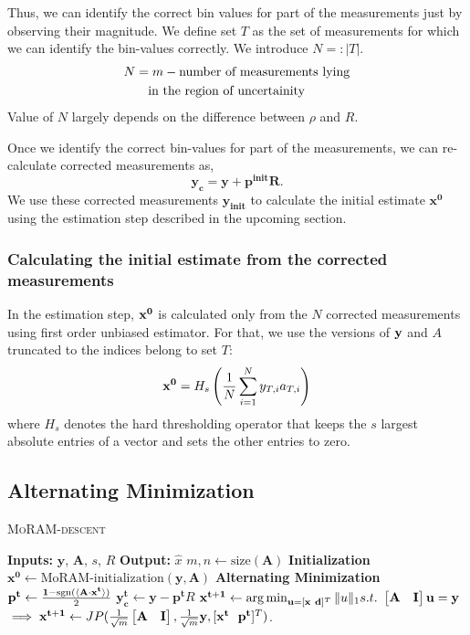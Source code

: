 Thus, we can identify the correct bin values for part of the measurements just by observing their magnitude. We define set $T$ as the set of measurements for which we can identify the bin-values correctly. We introduce $N=:|T|$.
\begin{align*}
N & =  m - \textnormal{number of measurements lying} \\
&~~~\textnormal{in the region of uncertainity}
\end{align*}
Value of $N$ largely depends on the difference between $\rho$ and $R$.

Once we identify the correct bin-values for part of the measurements, we can re-calculate corrected measurements as,
$$
\mathbf{y_{c} = y + p^{init}R}.
$$
We use these corrected measurements $\mathbf{y_{init}}$ to calculate the initial estimate $\mathbf{{x}^0}$ using the estimation step described in the upcoming section.
\subsubsection{Calculating the initial estimate from the corrected measurements}
In the estimation step, $\mathbf{x^0}$ is calculated only from the $N$ corrected measurements using first order unbiased estimator. For that, we use the versions of $\mathbf{y}$ and $A$ truncated to the indices belong to set $T$:
\begin{equation}
\mb{x^0} = H_s\left( \frac{1}{N}\sum_{i=1}^{N}y_{T,i}a_{T,i}\right)
\label{eq:init}
\end{equation}
where $H_s$ denotes the hard thresholding operator that keeps the $s$ largest absolute entries of a vector and sets the other entries to zero.
\subsection{Alternating Minimization}
\label{sec:altmin}
\begin{algorithm}[H]
	\caption{\textsc{MoRAM-descent}}
	\label{alg:MoRAM}
	\begin{algorithmic}
		\State\textbf{Inputs:} $\mathbf{y}$, $\mathbf{A}$, $s$, $R$
		\State\textbf{Output:}  $\widehat{x}$
		\State $m,n \leftarrow \mathrm{size}(\mathbf{A})$ 
		\State \textbf{Initialization}
		\State $\mathbf{x^0} \leftarrow \textrm{MoRAM-initialization}(\mathbf{y, A})$ 
		\State \textbf{Alternating Minimization}
		\State $\mathbf{{p}^{t}} \leftarrow \frac{\mathbf{1}-\mathrm{sgn}(\langle \mathbf{A} \cdot \mathbf{x^t} \rangle)}{2}$
		\State $\mathbf{y^t_c} \leftarrow \mathbf{y} - \mathbf{p^t}R$
		\State $\mathbf{{x}^{t+1}}\leftarrow \operatorname*{arg\,min}_{\mathbf{u}=[\mathbf{x~d}]^T}\|u\|_1  s.t.~ \begin{bmatrix} \mathbf{A} & \mathbf{I} \end{bmatrix}\mathbf{u} = \mathbf{y}$ 
		\State $\implies \mathbf{{x}^{t+1}}\leftarrow \small{JP(\frac{1}{\sqrt{m}}\begin{bmatrix} \mathbf{A} & \mathbf{I} \end{bmatrix},\frac{1}{\sqrt{m}}\mathbf{y},[\mathbf{x^t~~p^t}]^T)}$.
		\EndFor
	\end{algorithmic}
\end{algorithm}


